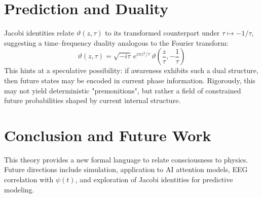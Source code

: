 \documentclass[12pt]{article}
\begin{document}
\section{Prediction and Duality}

Jacobi identities relate $\vartheta(z, \tau)$ to its transformed counterpart under $\tau \mapsto -1/\tau$, suggesting a time--frequency duality analogous to the Fourier transform:
\[
\vartheta(z, \tau) = \sqrt{-i\tau} \, e^{i\pi z^2/\tau} \, \vartheta\left(\frac{z}{\tau}, -\frac{1}{\tau}\right)
\]
This hints at a speculative possibility: if awareness exhibits such a dual structure, then future states may be encoded in current phase information. Rigorously, this may not yield deterministic "premonitions", but rather a field of constrained future probabilities shaped by current internal structure.

\section{Conclusion and Future Work}

This theory provides a new formal language to relate consciousness to physics. Future directions include simulation, application to AI attention models, EEG correlation with $\psi(t)$, and exploration of Jacobi identities for predictive modeling.



\end{document}
